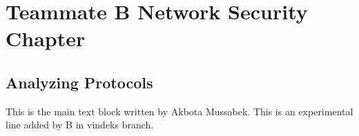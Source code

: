 \chapter{Teammate B Network Security Chapter}
\section{Analyzing Protocols}
This is the main text block written by Akbota Mussabek.
This is an experimental line added by B in vindeks branch.
